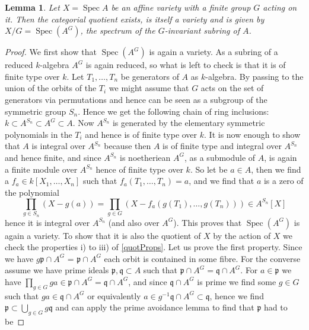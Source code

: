\documentclass[11pt, a4paper, german]{article}
\theoremstyle{plain}
\newtheorem{lemma}[theorem]{Lemma}
\theoremstyle{definition}
\DeclareMathOperator{\Spec}{Spec}
\begin{document}
\begin{lemma}
    \label{quotAffine}
    Let $X = \Spec{A}$ be an affine variety with a finite group $G$ acting on it. Then the categorial quotient exists, is itself a variety and
    is given by $X/G = \Spec(A^G)$, the spectrum of the $G$-invariant subring of $A$.
\end{lemma}
\begin{proof}
    We first show that $\Spec(A^G)$ is again a variety. As a subring of a reduced $k$-algebra $A^G$ is again reduced, so what is left to check
    is that it is of finite type over $k$. Let $T_1,\dots,T_n$ be generators of $A$ as $k$-algebra. By passing to the union of the orbits of
    the $T_i$ we might assume that $G$ acts on the set of generators via permutations and hence can be seen as a subgroup of the 
    symmetric group $S_n$. Hence we get the following chain of ring inclusions: $k \subset A^{S_n} \subset A^G \subset A$. Now $A^{S_n}$ is
    generated by the elementary symmetric polynomials in the $T_i$ and hence is of finite type over $k$.
    It is now enough to show that $A$ is integral over $A^{S_n}$ because then $A$ is of finite type and integral over $A^{S_n}$ and hence
    finite, and since $A^{S_n}$ is noetheriean $A^G$, as a submodule of $A$, 
    is again a finite module over $A^{S_n}$ hence of finite type over $k$.
    So let be $a \in A$, then we find a $f_a \in k[X_1,\dots,X_n]$ such that $f_a(T_1,\dots,T_n) = a$, and we find that $a$ is a zero of
    the polynomial
    \[
        \prod_{g \in S_n} (X - g(a)) = \prod_{g \in G} (X - f_a(g(T_1),\dots,g(T_n))) \in A^{S_n}[X]
    \]
    hence it is integral over $A^{S_n}$ (and also over $A^G$).
    This proves that $\Spec(A^G)$ is again a variety. To show that it is also the quotient of $X$ by the action of $X$ we check the properties
    i) to iii) of \ref{quotProps}. Let us prove the first property.
    Since we have $g\mathfrak{p} \cap A^G$ = $\mathfrak{p} \cap A^G$ each orbit is contained in some fibre. For the converse assume we have
    prime ideals $\mathfrak{p},\mathfrak{q} \subset A$ such that $\mathfrak{p} \cap A^G = \mathfrak{q} \cap A^G$.
    For $a \in \mathfrak{p}$ we have $\prod_{g \in G} ga \in \mathfrak{p} \cap A^G = \mathfrak{q} \cap A^G$, and since $\mathfrak{q} \cap A^G$
    is prime we find some $g \in G$ such that $ga \in \mathfrak{q} \cap A^G$ or equivalently 
    $a \in g^{-1}\mathfrak{q} \cap A^G \subset \mathfrak{q}$, hence 
    we find $\mathfrak{p} \subset \bigcup_{g \in G} g\mathfrak{q}$ and can apply the prime avoidance lemma to find that $\mathfrak{p}$ had to be

\end{proof}
\end{document}
